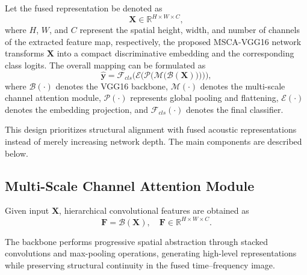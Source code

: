 \documentclass[anonymous]{iopjournal}
\begin{document}
Let the fused representation be denoted as 
\begin{equation}
	\boldsymbol{X} \in \mathbb{R}^{H \times W \times C},
\end{equation}
where $H$, $W$, and $C$ represent the spatial height, width, and number of channels of the extracted feature map, respectively, the proposed MSCA-VGG16 network transforms $\boldsymbol{X}$ into a compact discriminative embedding and the corresponding class logits. The overall mapping can be formulated as
\begin{equation}
	\hat{\mathbf{y}} = \mathcal{F}_{cls}\big(\mathcal{E}\big(\mathcal{P}\big(\mathcal{M}\big(\mathcal{B}(\boldsymbol{X})\big)\big)\big)\big),
	\label{eq:cls_pipeline}
\end{equation}
where $\mathcal{B}(\cdot)$ denotes the VGG16 backbone, $\mathcal{M}(\cdot)$ denotes the multi-scale channel attention module, $\mathcal{P}(\cdot)$ represents global pooling and flattening, $\mathcal{E}(\cdot)$ denotes the embedding projection, and $\mathcal{F}_{cls}(\cdot)$ denotes the final classifier.

This design prioritizes structural alignment with fused acoustic representations instead of merely increasing network depth. The main components are described below.

\subsection{Multi-Scale Channel Attention Module}
Given input $\boldsymbol{X}$, hierarchical convolutional features are obtained as
\begin{equation}
	\boldsymbol{F} = \mathcal{B}(\boldsymbol{X}), \quad \boldsymbol{F} \in \mathbb{R}^{H \times W \times C}.
	\label{eq:feature_map}
\end{equation}

The backbone performs progressive spatial abstraction through stacked convolutions and max-pooling operations, generating high-level representations while preserving structural continuity in the fused time–frequency image.
\end{document}
